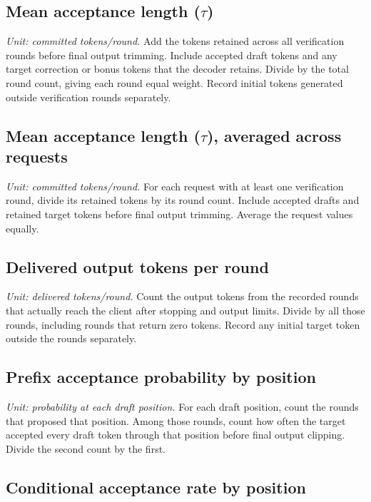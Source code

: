 \subsection{Mean acceptance length (\(\tau\))}

\textit{Unit: committed tokens/round.} Add the tokens retained across all verification rounds before final output trimming. Include accepted draft tokens and any target correction or bonus tokens that the decoder retains. Divide by the total round count, giving each round equal weight. Record initial tokens generated outside verification rounds separately.

\subsection{Mean acceptance length (\(\tau\)), averaged across requests}

\textit{Unit: committed tokens/round.} For each request with at least one verification round, divide its retained tokens by its round count. Include accepted drafts and retained target tokens before final output trimming. Average the request values equally.

\subsection{Delivered output tokens per round}

\textit{Unit: delivered tokens/round.} Count the output tokens from the recorded rounds that actually reach the client after stopping and output limits. Divide by all those rounds, including rounds that return zero tokens. Record any initial target token outside the rounds separately.

\subsection{Prefix acceptance probability by position}

\textit{Unit: probability at each draft position.} For each draft position, count the rounds that proposed that position. Among those rounds, count how often the target accepted every draft token through that position before final output clipping. Divide the second count by the first.

\subsection{Conditional acceptance rate by position}


